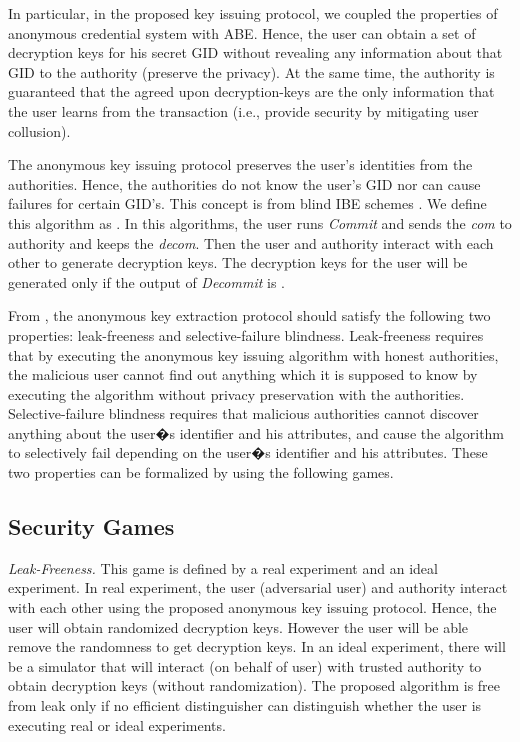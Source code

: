\documentclass[10pt,journal]{IEEEtran}
\begin{document}
In particular, in the proposed key issuing protocol, we coupled the properties of anonymous credential system with ABE. Hence, the user can obtain a set of decryption keys for his secret GID without revealing any information about that GID to the authority (preserve the privacy). At the same time, the authority is guaranteed that the agreed upon decryption-keys are the only information that the user learns from the transaction (i.e., provide security by mitigating user collusion).



The anonymous key issuing protocol preserves the user's identities from the authorities. Hence, the authorities do not know the user's GID nor can cause failures for certain GID's. This concept is from blind IBE schemes  \cite{IBE1}. We define this algorithm as  .
In this algorithms, the user runs \textit{Commit} and sends the \textit{com} to authority and keeps the \textit{decom}. Then the user and authority interact with each other to generate decryption keys. The decryption keys for the user will be  generated only if the output of \textit{Decommit} is .


From \cite{IBE1}, the anonymous key extraction protocol should satisfy the following two properties: leak-freeness and selective-failure blindness. Leak-freeness requires that by executing the anonymous key issuing algorithm with honest authorities, the malicious user cannot find out anything which it is supposed to know by executing the algorithm without privacy preservation with the authorities. Selective-failure blindness requires that malicious authorities cannot discover anything about the user�s identifier and his attributes, and cause the algorithm to selectively fail depending on the user�s identifier and his attributes. These two properties can be formalized by using the following games.

\subsection{Security Games}

\textit{Leak-Freeness.} This game is defined by a real experiment and an ideal experiment. In real experiment, the user (adversarial user) and authority interact with each other using the proposed anonymous key issuing protocol. Hence, the user will obtain randomized decryption keys. However the user will be able remove the randomness to get decryption keys. In an ideal experiment, there will be a simulator that will interact (on behalf of user) with trusted authority to obtain decryption keys (without randomization). The proposed algorithm is free from leak only if no efficient distinguisher can distinguish whether the user is executing real or ideal experiments.
\end{document}

